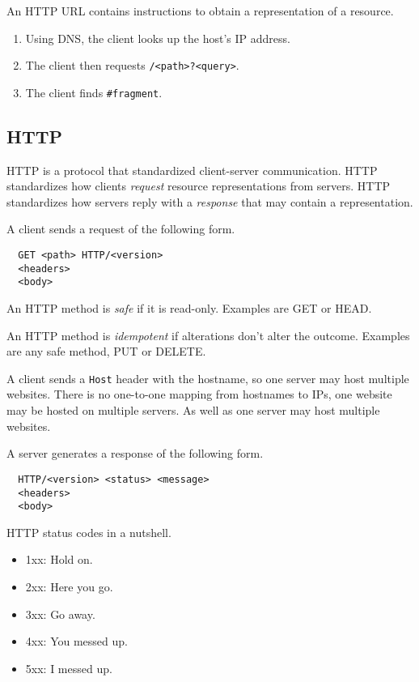 \documentclass{report}
\begin{document}
An HTTP URL contains instructions
to obtain a representation of a resource.
\begin{enumerate}
  \item Using DNS, the client looks up the host's IP address.
  \item The client then requests \texttt{/<path>?<query>}.
  \item The client finds \texttt{\#fragment}.
\end{enumerate}

\subsection{HTTP}

HTTP is a protocol that standardized client-server communication.
HTTP standardizes how clients \emph{request}
resource representations from servers.
HTTP standardizes how servers reply with a \emph{response}
that may contain a representation.

A client sends a request of the following form.
\begin{lstlisting}
  GET <path> HTTP/<version>
  <headers>
  <body>
\end{lstlisting}

An HTTP method is \emph{safe} if it is read-only.
Examples are GET or HEAD.

An HTTP method is \emph{idempotent} if
alterations don't alter the outcome.
Examples are any safe method, PUT or DELETE.

A client sends a \texttt{Host} header with the hostname,
so one server may host multiple websites.
There is no one-to-one mapping from hostnames to IPs,
one website may be hosted on multiple servers.
As well as one server may host multiple websites.

A server generates a response of the following form.
\begin{lstlisting}
  HTTP/<version> <status> <message>
  <headers>
  <body>
\end{lstlisting}

HTTP status codes in a nutshell.
\begin{itemize}
  \item 1xx: Hold on.
  \item 2xx: Here you go.
  \item 3xx: Go away.
  \item 4xx: You messed up.
  \item 5xx: I messed up.
\end{itemize}
\end{document}
